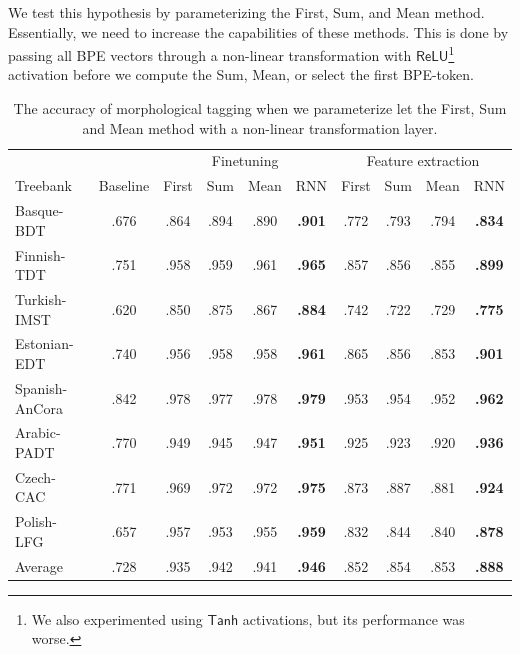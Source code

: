 \documentclass[11pt]{article}
\begin{document}
             We test this hypothesis by parameterizing the First, Sum,
     and Mean method. Essentially, we need to increase the
     capabilities of these methods.
        This is done by passing all BPE vectors through a non-linear
     transformation with $\mathsf{ReLU}$\footnote{We also experimented
     using $\mathsf{Tanh}$ activations, but its performance was worse.}
     activation before we compute the Sum, Mean, or select the first
     BPE-token.
    


        \begin{table}%
	\centering
	\begin{tabular}{l|c|cccc|cccc}
		& & \multicolumn{4}{c}{Finetuning} & \multicolumn{4}{c}{Feature extraction} \\
		Treebank & Baseline & First & Sum & Mean & RNN & First & Sum & Mean & RNN \\
		\hline
		Basque-BDT      & .676 & .864 & .894 & .890 & \textbf{.901} & .772 & .793 & .794 & \textbf{.834} \\
		Finnish-TDT     & .751 & .958 & .959 & .961 & \textbf{.965} & .857 & .856 & .855 & \textbf{.899} \\
		Turkish-IMST    & .620 & .850 & .875 & .867 & \textbf{.884} & .742 & .722 & .729 & \textbf{.775} \\
		Estonian-EDT    & .740 & .956 & .958 & .958 & \textbf{.961} & .865 & .856 & .853 & \textbf{.901} \\
		Spanish-AnCora  & .842 & .978 & .977 & .978 & \textbf{.979} & .953 & .954 & .952 & \textbf{.962} \\
		Arabic-PADT     & .770 & .949 & .945 & .947 & \textbf{.951} & .925 & .923 & .920 & \textbf{.936} \\
		Czech-CAC       & .771 & .969 & .972 & .972 & \textbf{.975} & .873 & .887 & .881 & \textbf{.924} \\
		Polish-LFG      & .657 & .957 & .953 & .955 & \textbf{.959} & .832 & .844 & .840 & \textbf{.878} \\
        \hline
        Average         & .728 & .935 & .942 & .941 & \textbf{.946} & .852 & .854 & .853 & \textbf{.888} \\
	\end{tabular}
        	\caption{\label{tab:commutative-parameters} The accuracy
     of morphological tagging when we parameterize let the First, Sum and Mean method
     with a non-linear transformation layer.}
    \end{table}
\end{document}
